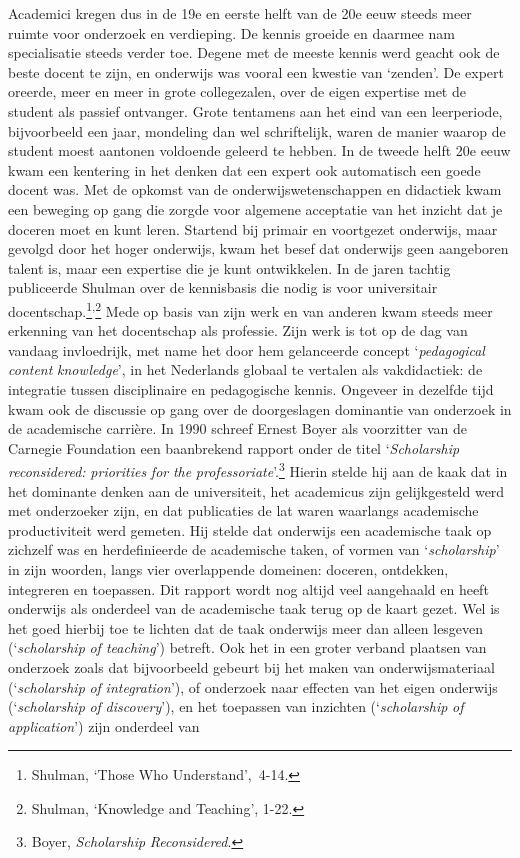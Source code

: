 \documentclass[smallauthor, chapterhaspagenum, nochapterinheader, pagenuminheader,  bigchapnum,medium2, tocpages, garamond, titleinheader]{jote-book}
\begin{document}
	Academici kregen dus in de 19e en eerste helft van de 20e eeuw steeds meer ruimte voor onderzoek en verdieping. De kennis groeide en daarmee nam specialisatie steeds verder toe. Degene met de meeste kennis werd geacht ook de beste docent te zijn, en onderwijs was vooral een kwestie van ‘zenden'. De expert oreerde, meer en meer in grote collegezalen, over de eigen expertise met de student als passief ontvanger. Grote tentamens aan het eind van een leerperiode, bijvoorbeeld een jaar, mondeling dan wel schriftelijk, waren de manier waarop de student moest aantonen voldoende geleerd te hebben. In de tweede helft 20e eeuw kwam een kentering in het denken dat een expert ook automatisch een goede docent was. Met de opkomst van de onderwijswetenschappen en didactiek kwam een beweging op gang die zorgde voor algemene acceptatie van het inzicht dat je doceren moet en kunt leren. Startend bij primair en voortgezet onderwijs, maar gevolgd door het hoger onderwijs, kwam het besef dat onderwijs geen aangeboren talent is, maar een expertise die je kunt ontwikkelen. In de jaren tachtig publiceerde Shulman over de kennisbasis die nodig is voor universitair docentschap.\footnote{Shulman, ‘Those Who Understand', 4-14.}\textsuperscript{,}\footnote{Shulman, ‘Knowledge and Teaching', 1-22.} Mede op basis van zijn werk en van anderen kwam steeds meer erkenning van het docentschap als professie. Zijn werk is tot op de dag van vandaag invloedrijk, met name het door hem gelanceerde concept ‘\emph{pedagogical}\emph{ content }\emph{knowledge}', in het Nederlands globaal te vertalen als vakdidactiek: de integratie tussen disciplinaire en pedagogische kennis. Ongeveer in dezelfde tijd kwam ook de discussie op gang over de doorgeslagen dominantie van onderzoek in de academische carrière. In 1990 schreef Ernest Boyer als voorzitter van de Carnegie Foundation een baanbrekend rapport onder de titel ‘\emph{Scholarship}\emph{ }\emph{reconsidered}\emph{: }\emph{priorities}\emph{ }\emph{for}\emph{ }\emph{the}\emph{ }\emph{professoriate}'.\footnote{Boyer, \emph{Scholarship}\emph{ }\emph{Reconsidered}. } Hierin stelde hij aan de kaak dat in het dominante denken aan de universiteit, het academicus zijn gelijkgesteld werd met onderzoeker zijn, en dat publicaties de lat waren waarlangs academische productiviteit werd gemeten. Hij stelde dat onderwijs een academische taak op zichzelf was en herdefinieerde de academische taken, of vormen van ‘\emph{scholarship}' in zijn woorden, langs vier overlappende domeinen: doceren, ontdekken, integreren en toepassen. Dit rapport wordt nog altijd veel aangehaald en heeft onderwijs als onderdeel van de academische taak terug op de kaart gezet. Wel is het goed hierbij toe te lichten dat de taak onderwijs meer dan alleen lesgeven (‘\emph{scholarship}\emph{ of teaching}') betreft. Ook het in een groter verband plaatsen van onderzoek zoals dat bijvoorbeeld gebeurt bij het maken van onderwijsmateriaal (‘\emph{scholarship}\emph{ of }\emph{integration}'), of onderzoek naar effecten van het eigen onderwijs (‘\emph{scholarship}\emph{ of }\emph{discovery}'), en het toepassen van inzichten (‘\emph{scholarship}\emph{ of }\emph{application}') zijn onderdeel van 
\end{document}
